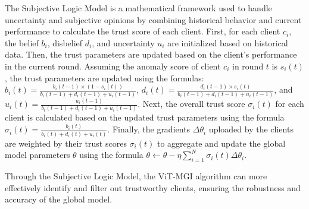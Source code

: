 \documentclass[conference]{IEEEtran}
\begin{document}


The Subjective Logic Model is a mathematical framework used to handle uncertainty and subjective opinions by combining historical behavior and current performance to calculate the trust score of each client. First, for each client $c_i$, the belief $b_i$, disbelief $d_i$, and uncertainty $u_i$ are initialized based on historical data. Then, the trust parameters are updated based on the client's performance in the current round. Assuming the anomaly score of client $c_i$ in round $t$ is $s_i(t)$, the trust parameters are updated using the formulas: $b_i(t) = \frac{b_i(t-1) \times (1 - s_i(t))}{b_i(t-1) + d_i(t-1) + u_i(t-1)}$, $d_i(t) = \frac{d_i(t-1) \times s_i(t)}{b_i(t-1) + d_i(t-1) + u_i(t-1)}$, and $u_i(t) = \frac{u_i(t-1)}{b_i(t-1) + d_i(t-1) + u_i(t-1)}$. Next, the overall trust score $\sigma_i(t)$ for each client is calculated based on the updated trust parameters using the formula $\sigma_i(t) = \frac{b_i(t)}{b_i(t) + d_i(t) + u_i(t)}$. Finally, the gradients $\Delta \theta_i$ uploaded by the clients are weighted by their trust scores $\sigma_i(t)$ to aggregate and update the global model parameters $\theta$ using the formula $\theta \leftarrow \theta - \eta \sum_{i=1}^N \sigma_i(t) \Delta \theta_i$.


Through the Subjective Logic Model, the ViT-MGI algorithm can more effectively identify and filter out trustworthy clients, ensuring the robustness and accuracy of the global model.

                
\end{document}
